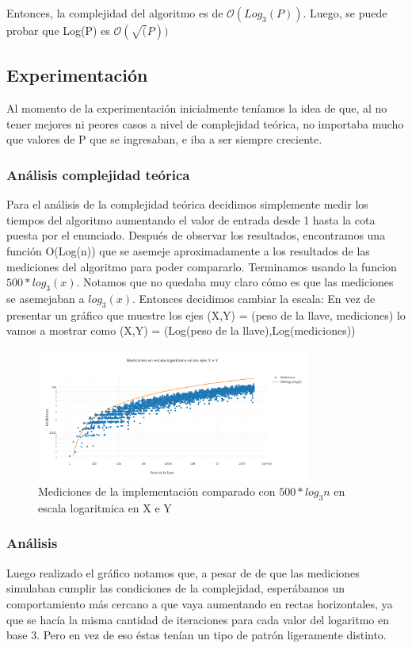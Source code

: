 \documentclass[spanish,12pt]{article}
\begin{document}
Entonces, la complejidad del algoritmo es de $\mathcal{O}(Log_{3}(P))$.
Luego, se puede probar que Log(P) es $\mathcal{O}(\sqrt(P))$


\subsection{Experimentación}
 Al momento de la experimentación inicialmente teníamos la idea de que, al no tener mejores ni peores casos a nivel de complejidad teórica, no importaba mucho que valores de P que se ingresaban, e iba a ser siempre creciente.

\subsubsection{Análisis complejidad te\'orica}
 Para el análisis de la complejidad te\'orica decidimos simplemente medir los tiempos del algoritmo aumentando el valor de entrada desde 1 hasta la cota puesta por el enunciado.
  Después de observar los resultados, encontramos una función O(Log(n)) que se asemeje aproximadamente a los resultados de las mediciones del algoritmo para poder compararlo.
  Terminamos usando la funcion $500*log_3(x)$.
  Notamos que no quedaba muy claro cómo es que las mediciones se asemejaban a $log_3(x)$. Entonces decidimos cambiar la escala:
  En vez de presentar un gráfico que muestre los ejes (X,Y) = (peso de la llave, mediciones) lo vamos a mostrar como (X,Y) = (Log(peso de la llave),Log(mediciones))

	\begin{figure}[H]
	\centering
	\includegraphics[width=0.8\textwidth]{punto2-mediciones}
	\caption{Mediciones de la implementaci\'on comparado con $500*log_{3}{n}$ en escala logaritmica en X e Y}
	\end{figure}



\subsubsection{Análisis}
Luego realizado el gráfico notamos que, a pesar de de que las mediciones simulaban cumplir las condiciones de la complejidad, esperábamos un comportamiento más cercano a que vaya aumentando en rectas horizontales, ya que se hacía la misma cantidad de iteraciones para cada valor del logaritmo en base 3. Pero en vez de eso éstas tenían un tipo de patrón ligeramente distinto.
\end{document}
